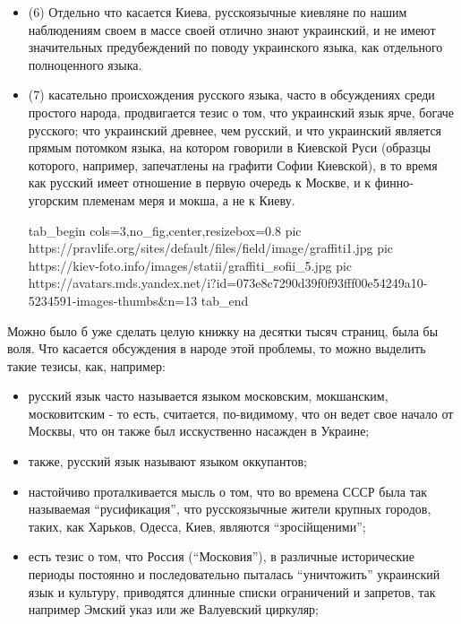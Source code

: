 \begin{itemize}
\item (6) Отдельно что касается Киева, русскоязычные киевляне по нашим
наблюдениям своем в массе своей отлично знают украинский, и не имеют
значительных предубеждений по поводу украинского языка, как отдельного
полноценного языка.

\item (7) касательно происхождения русского языка, часто в обсуждениях среди
простого народа, продвигается тезис о том, что украинский язык ярче, богаче
русского; что украинский древнее, чем русский, и что украинский является прямым
потомком языка, на котором говорили в Киевской Руси (образцы которого,
например, запечатлены на графити Софии Киевской), в то время как русский имеет
отношение в первую очередь к Москве, и к финно-угорским племенам меря и мокша,
а не к Киеву.

\ifcmt
  tab_begin cols=3,no_fig,center,resizebox=0.8
     pic https://pravlife.org/sites/default/files/field/image/graffiti1.jpg
		 pic https://kiev-foto.info/images/statii/graffiti_sofii_5.jpg
		 pic https://avatars.mds.yandex.net/i?id=073e8c7290d39f0f93fff00e54249a10-5234591-images-thumbs&n=13
  tab_end
\fi

\end{itemize} %

Можно было б уже сделать целую книжку на десятки тысяч страниц, была
бы воля. Что касается обсуждения в народе этой проблемы, то можно выделить такие тезисы, как, например:

\begin{itemize} %
\item русский язык часто называется языком московским, мокшанским, московитским - то есть, считается, по-видимому,
что он ведет свое начало от Москвы, что он также был исскуственно насажден в Украине;
\item также, русский язык называют языком оккупантов;
\item настойчиво проталкивается мысль о том, что во времена СССР была так
называемая \enquote{русификация}, что русскоязычные жители крупных городов,
таких, как Харьков, Одесса, Киев, являются \enquote{зросійщеними};
\item есть тезис о том, что Россия (\enquote{Московия}), в различные
исторические периоды постоянно и последовательно пыталась
\enquote{уничтожить} украинский язык и культуру, приводятся длинные
списки ограничений и запретов, так например Эмский указ или же
Валуевский циркуляр;
\end{itemize} %


